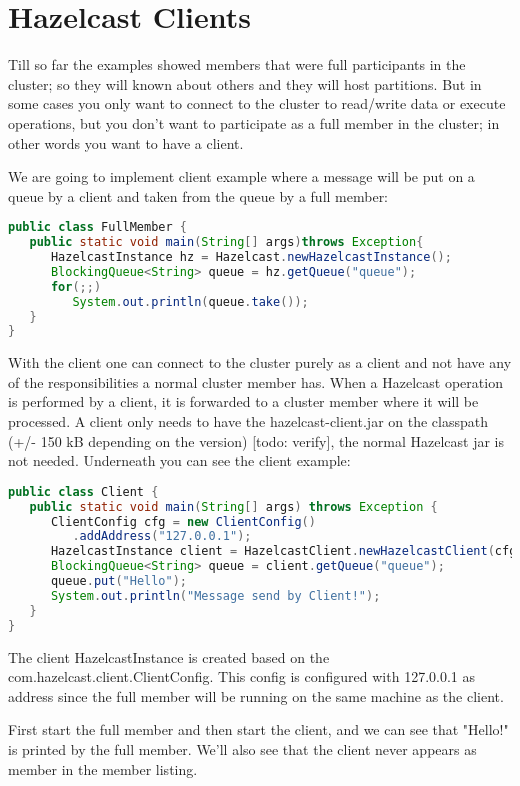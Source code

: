 \chapter{Hazelcast Clients}
Till so far the examples showed members that were full participants in the cluster; so they will known about others and they will host partitions. But in some cases you only want to connect to the cluster to read/write data or execute operations, but you don't want to participate as a full member in the cluster; in other words you want to have a client.

We are going to implement client example where a message will be put on a queue by a client and taken from the queue by a full member:
\begin{lstlisting}[language=java]
public class FullMember {
   public static void main(String[] args)throws Exception{
      HazelcastInstance hz = Hazelcast.newHazelcastInstance();
      BlockingQueue<String> queue = hz.getQueue("queue");
      for(;;) 
         System.out.println(queue.take());
   }
}
\end{lstlisting}

With the client one can connect to the cluster purely as a client and not have any of the responsibilities a normal cluster member has. When a Hazelcast operation is performed by a client, it is forwarded to a cluster member where it will be processed. A client only needs to have the hazelcast-client.jar on the classpath (+/- 150 kB depending on the version) [todo: verify], the normal Hazelcast jar is not needed. Underneath you can see the client example:
\begin{lstlisting}[language=java]
public class Client {
   public static void main(String[] args) throws Exception {
      ClientConfig cfg = new ClientConfig()
         .addAddress("127.0.0.1");
      HazelcastInstance client = HazelcastClient.newHazelcastClient(cfg);
      BlockingQueue<String> queue = client.getQueue("queue");
      queue.put("Hello");
      System.out.println("Message send by Client!");
   }
}
\end{lstlisting}
The client HazelcastInstance is created based on the com.hazelcast.client.ClientConfig. This config is configured with 127.0.0.1 as address since the full member will be running on the same machine as the client.

First start the full member and then start the client, and we can see that "Hello!" is printed by the full member. We'll also see that the client never appears as member in the member listing.	
 
